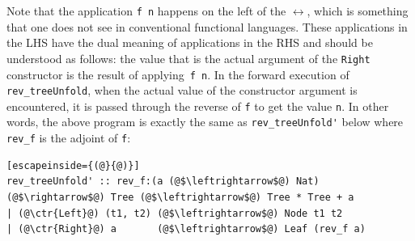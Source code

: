 \documentclass{article}
\newcommand{\ctr}[1]{{\scriptsize{\texttt{#1}}}}
\begin{document}
\noindent Note that the application \lstinline{f n} happens on the left of
the \ensuremath{\leftrightarrow}, which is something that one does not see in conventional
functional languages. These applications in the LHS have the dual meaning of
applications in the RHS and should be understood as follows: the value that
is the actual argument of the \ctr{Right} constructor is the result of
applying~\lstinline{f n}. In the forward execution of
\lstinline{rev_treeUnfold}, when the actual value of the constructor argument
is encountered, it is passed through the reverse of \ctr{f} to get the value
\ctr{n}. In other words, the above program is exactly the same as
\lstinline{rev_treeUnfold'} below where \lstinline{rev_f} is the adjoint of
\ctr{f}:

\begin{lstlisting}[escapeinside={(@}{@)}]
rev_treeUnfold' :: rev_f:(a (@$\leftrightarrow$@) Nat) (@$\rightarrow$@) Tree (@$\leftrightarrow$@) Tree * Tree + a
| (@\ctr{Left}@) (t1, t2) (@$\leftrightarrow$@) Node t1 t2
| (@\ctr{Right}@) a       (@$\leftrightarrow$@) Leaf (rev_f a)
 \end{lstlisting}
\end{document}
